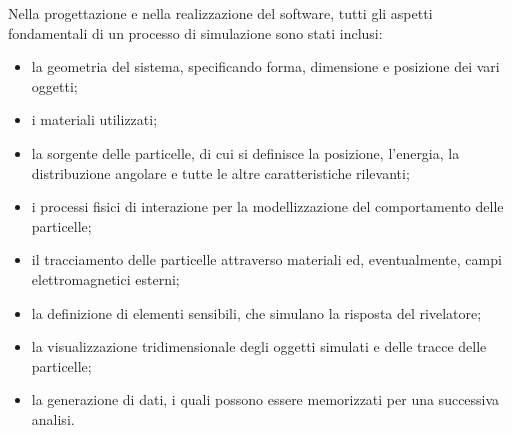 Nella progettazione e nella realizzazione del software, tutti gli aspetti fondamentali di un processo di simulazione sono stati inclusi:
\begin{itemize}
	\item la geometria del sistema, specificando forma, dimensione e posizione dei vari oggetti;
	\item i materiali utilizzati;
	\item la sorgente delle particelle, di cui si definisce la posizione, l'energia, la distribuzione angolare e tutte le altre caratteristiche rilevanti;
	\item i processi fisici di interazione per la modellizzazione  del comportamento delle particelle;
	\item il tracciamento delle particelle attraverso materiali ed, eventualmente, campi elettromagnetici esterni;
	\item la definizione di elementi sensibili, che simulano la risposta del rivelatore;
	\item la visualizzazione tridimensionale degli oggetti simulati e delle tracce delle particelle;
	\item la generazione di dati, i quali possono essere memorizzati per una successiva analisi.
\end{itemize}



